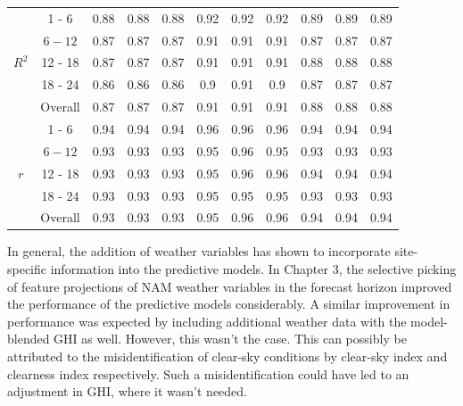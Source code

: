 \begin{table}[h]
\begin{center}
\begin{tabular}{@{}ccccccccccc@{}}
    \midrule
    \multirow{5}{*}{$R^2$}  & 1 - 6 & 0.88  & 0.88  & 0.88  & 0.92  & 0.92  & 0.92  & 0.89  & 0.89  & 0.89 \\
           & $6 - 12$   & 0.87  & 0.87  & 0.87  & 0.91  & 0.91  & 0.91  & 0.87  & 0.87  & 0.87 \\
           & 12 - 18    & 0.87  & 0.87  & 0.87  & 0.91  & 0.91  & 0.91  & 0.88  & 0.88  & 0.88 \\
           & 18 - 24    & 0.86  & 0.86  & 0.86  & 0.9   & 0.91  & 0.9   & 0.87  & 0.87  & 0.87 \\
           & Overall    & 0.87  & 0.87  & 0.87  & 0.91  & 0.91  & 0.91  & 0.88  & 0.88  & 0.88 \\                     
    \midrule
    \multirow{5}{*}{$r$}  & 1 - 6 & 0.94  & 0.94  & 0.94  & 0.96  & 0.96  & 0.96  & 0.94  & 0.94  & 0.94 \\
           & $6 - 12$   & 0.93  & 0.93  & 0.93  & 0.95  & 0.96  & 0.95  & 0.93  & 0.93  & 0.93 \\
           & 12 - 18    & 0.93  & 0.93  & 0.93  & 0.95  & 0.96  & 0.96  & 0.94  & 0.94  & 0.94 \\
           & 18 - 24    & 0.93  & 0.93  & 0.93  & 0.95  & 0.95  & 0.95  & 0.93  & 0.93  & 0.93 \\
           & Overall    & 0.93  & 0.93  & 0.93  & 0.95  & 0.96  & 0.96  & 0.94  & 0.94  & 0.94 \\                     

    \bottomrule
    \end{tabular}
\end{center}
\end{table}

\par In general, the addition of weather variables has shown to incorporate site-specific information into the predictive models. In Chapter 3, the selective picking of feature projections of NAM weather variables in the forecast horizon improved the performance of the predictive models considerably. A similar improvement in performance was expected by including additional weather data with the model-blended GHI as well. However, this wasn't the case. This can possibly be attributed to the misidentification of clear-sky conditions by clear-sky index and clearness index respectively. Such a misidentification could have led to an adjustment in GHI, where it wasn't needed.

